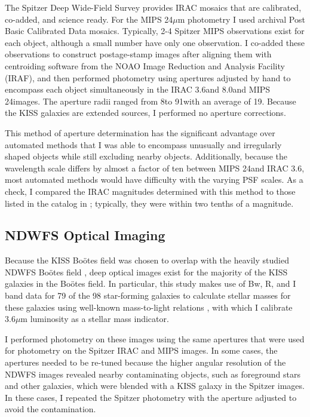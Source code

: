 The Spitzer Deep Wide-Field Survey provides IRAC mosaics that are calibrated, co-added, and science ready.  For the MIPS 24$\mu$m photometry I used archival Post Basic Calibrated Data mosaics. Typically, 2-4 Spitzer MIPS observations exist for each object, although a small number have only one observation. I co-added these observations to construct postage-stamp images after aligning them with centroiding software from the NOAO Image Reduction and Analysis Facility (IRAF), and then performed photometry using apertures adjusted by hand to encompass each object simultaneously in the IRAC 3.6\micron and 8.0\micron and MIPS 24\micron images.  The aperture radii ranged from 8\arcsec to 91\arcsec with an average of 19\arcsec. Because the KISS galaxies are extended sources, I performed no aperture corrections.

This method of aperture determination has the significant advantage over automated methods that I was able to encompass unusually and irregularly shaped objects while still excluding nearby objects.  Additionally, because the wavelength scale differs by almost a factor of ten between MIPS 24\micron and IRAC 3.6\micron, most automated methods would have difficulty with the varying PSF scales. As a check, I compared the IRAC magnitudes determined with this method to those listed in the catalog in \cite{SDWFS}; typically, they were within two tenths of a magnitude.

\subsection{NDWFS Optical Imaging}\label{optical}

Because the KISS Bo\"{o}tes field was chosen to overlap with the heavily studied NDWFS Bo\"{o}tes field \citep{Jannuzi}, deep optical images exist for the majority of the KISS galaxies in the Bo\"{o}tes field.  In particular, this study makes use of Bw, R, and I band data for 79 of the 98 star-forming galaxies to calculate stellar masses for these galaxies using well-known mass-to-light relations \citep{Bell}, with which I calibrate 3.6$\mu$m luminosity as a stellar mass indicator.

I performed photometry on these images using the same apertures that were used for photometry on the Spitzer IRAC and MIPS images.  In some cases, the apertures needed to be re-tuned because the higher angular resolution of the NDWFS images revealed nearby contaminating objects, such as foreground stars and other galaxies, which were blended with a KISS galaxy in the Spitzer images.  In these cases, I repeated the Spitzer photometry with the aperture adjusted to avoid the contamination.

